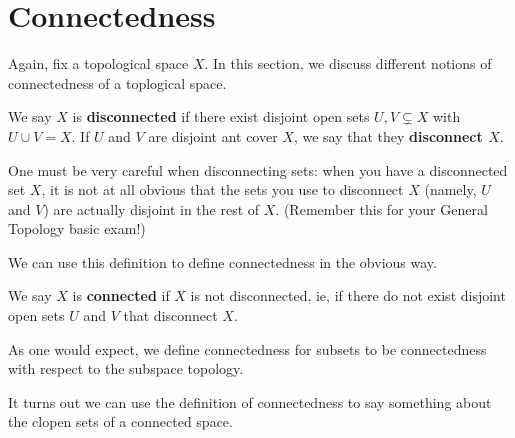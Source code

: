 \section{Connectedness}

Again, fix a topological space $X$. In this section, we discuss different notions of connectedness of a toplogical space.

\begin{boxdefinition}[Disconnectedness]
    We say $X$ is \textbf{disconnected} if there exist disjoint open sets $U, V \subsetneq X$ with $U \cup V = X$. If $U$ and $V$ are disjoint ant cover $X$, we say that they \textbf{disconnect $X$}.
\end{boxdefinition}
\begin{remark}
    One must be very careful when disconnecting sets: when you have a disconnected set $X$, it is not at all obvious that the sets you use to disconnect $X$ (namely, $U$ and $V$) are actually disjoint in the rest of $X$. (Remember this for your General Topology basic exam!)
\end{remark}

We can use this definition to define connectedness in the obvious way.

\begin{boxdefinition}[Connectedness]
    We say $X$ is \textbf{connected} if $X$ is not disconnected, ie, if there do not exist disjoint open sets $U$ and $V$ that disconnect $X$.
\end{boxdefinition}

As one would expect, we define connectedness for subsets to be connectedness with respect to the subspace topology.

It turns out we can use the definition of connectedness to say something about the clopen sets of a connected space.

